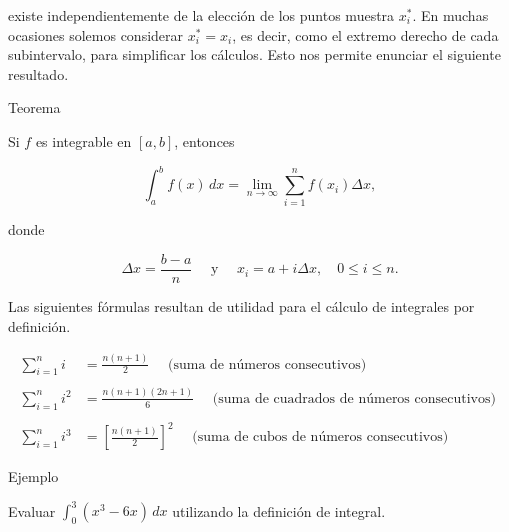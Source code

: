 \documentclass[
  letterpaper,
]{book}
\theoremstyle{plain}
\theoremstyle{remark}
\begin{document}
existe independientemente de la elección de los puntos muestra
\(x_i^*\). En muchas ocasiones solemos considerar \(x_i^*=x_i\), es
decir, como el extremo derecho de cada subintervalo, para simplificar
los cálculos. Esto nos permite enunciar el siguiente resultado.

\label{teo-puntosder}
Teorema

Si \(f\) es integrable en \([a, b]\), entonces

\[
\int_a^b f(x)\,dx=\lim_{n\to \infty} \sum_{i=1}^n f(x_i)\Delta x,
\]

donde

\[
\Delta x = \frac{b-a}{n} \quad \text{ y }\quad x_i=a+i\Delta x, \quad 0\leq i\leq n.
\]

Las siguientes fórmulas resultan de utilidad para el cálculo de
integrales por definición.

\label{form-sumas}
\[
\begin{aligned}
\sum_{i=1}^n i &= \frac{n(n+1)}{2} \quad \text{ (suma de números consecutivos) }\\
\\
\sum_{i=1}^n i^2 &= \frac{n(n+1)(2n+1)}{6} \quad \text{ (suma de cuadrados de números consecutivos) }\\
\\
\sum_{i=1}^n i^3 &= \left[\frac{n(n+1)}{2}\right]^2 \quad \text{ (suma de cubos de números consecutivos) }
\end{aligned}
\]

Ejemplo

Evaluar \(\displaystyle \int_0^3 (x^3-6x)\,dx\) utilizando la definición
de integral.
\end{document}
